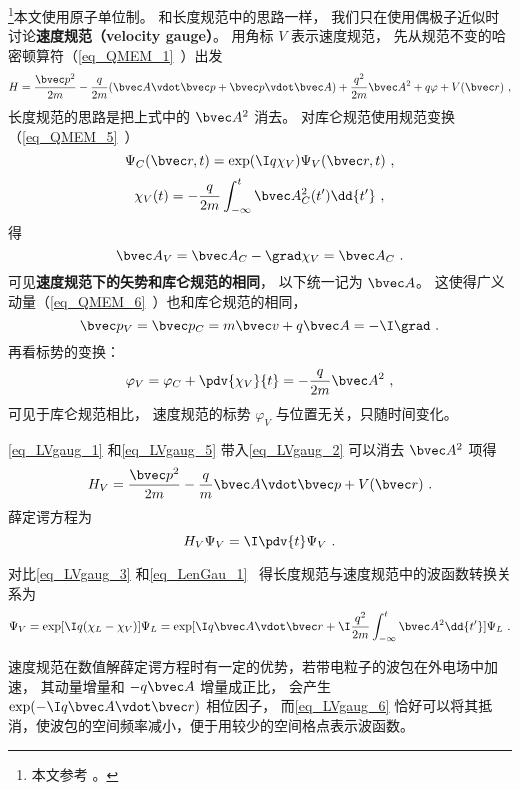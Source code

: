 

\footnote{本文参考 \cite{Bransden}。}本文使用原子单位制。 和长度规范中的思路一样， 我们只在使用偶极子近似时讨论\textbf{速度规范（velocity gauge）}。 用角标 $V$ 表示速度规范， 先从规范不变的哈密顿算符（\autoref{eq_QMEM_1}~）出发
\begin{equation}\label{eq_LVgaug_2}
H = \frac{\bvec p^2}{2m} - \frac{q}{2m} (\bvec A \vdot \bvec p + \bvec p \vdot \bvec A)
+ \frac{q^2}{2m} \bvec A^2 + q \varphi + V(\bvec r)~,
\end{equation}
长度规范的思路是把上式中的 $\bvec A^2$ 消去。 对库仑规范使用规范变换（\autoref{eq_QMEM_5}~）
\begin{equation}\label{eq_LVgaug_3}
\Psi_C(\bvec r, t) = \exp(\I q\chi_V)\Psi_V(\bvec r, t)~,
\end{equation}
\begin{equation}\label{eq_LVgaug_4}
\chi_V(t) = -\frac{q}{2m} \int_{-\infty}^t \bvec A_C^2(t') \dd{t'}~,
\end{equation}
得
\begin{equation}\label{eq_LVgaug_1}
\bvec A_V = \bvec A_C - \grad \chi_V = \bvec A_C~.
\end{equation}
可见\textbf{速度规范下的矢势和库仑规范的相同}， 以下统一记为 $\bvec A$。 这使得广义动量（\autoref{eq_QMEM_6}~）也和库仑规范的相同， 
\begin{equation}
\bvec p_V = \bvec p_C =  m \bvec v + q\bvec A = -\I \grad~.
\end{equation}
再看标势的变换：
\begin{equation}\label{eq_LVgaug_5}
\varphi_V = \varphi_C + \pdv{\chi_V}{t} = - \frac{q}{2m} \bvec A^2~,
\end{equation}
可见于库仑规范相比， 速度规范的标势 $\varphi_V$ 与位置无关，只随时间变化。

\autoref{eq_LVgaug_1} 和\autoref{eq_LVgaug_5} 带入\autoref{eq_LVgaug_2} 可以消去 $\bvec A^2$ 项得
\begin{equation}
H_V = \frac{\bvec p^2}{2m} - \frac{q}{m} \bvec A \vdot \bvec p + V(\bvec r)~.
\end{equation}
薛定谔方程为
\begin{equation}\label{eq_LVgaug_7}
H_V \Psi_V = \I \pdv{t} \Psi_V~.
\end{equation}


对比\autoref{eq_LVgaug_3} 和\autoref{eq_LenGau_1}~ 得长度规范与速度规范中的波函数转换关系为
\begin{equation}\label{eq_LVgaug_6}
\Psi_V = \exp[\I q(\chi_L - \chi_V)]\Psi_L = \exp[\I q \bvec A\vdot \bvec r + \I\frac{q^2}{2m}\int_{-\infty}^t \bvec A^2\dd{t'}] \Psi_L~.
\end{equation}

速度规范在数值解薛定谔方程时有一定的优势，若带电粒子的波包在外电场中加速， 其动量增量和 $-q\bvec A$ 增量成正比， 会产生 $\exp(-\I q\bvec A\vdot\bvec r)$ 相位因子， 而\autoref{eq_LVgaug_6} 恰好可以将其抵消，使波包的空间频率减小，便于用较少的空间格点表示波函数。
